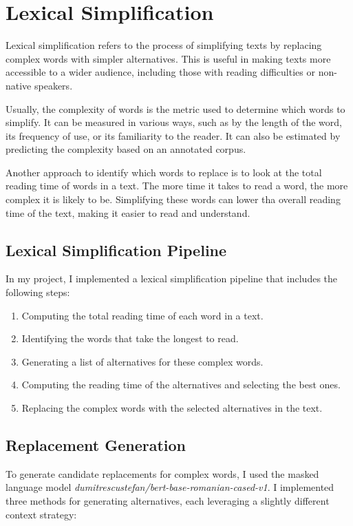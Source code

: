 \chapter{Lexical Simplification}

Lexical simplification refers to the process of simplifying texts by replacing complex words with simpler alternatives. This is useful in making texts more accessible to a wider audience, including those with reading difficulties or non-native speakers. 

Usually, the complexity of words is the metric used to determine which words to simplify. It can be measured in various ways, such as by the length of the word, its frequency of use, or its familiarity to the reader. It can also be estimated by predicting the complexity based on an annotated corpus. 

Another approach to identify which words to replace is to look at the total reading time of words in a text. The more time it takes to read a word, the more complex it is likely to be. Simplifying these words can lower tha overall reading time of the text, making it easier to read and understand.

\section{Lexical Simplification Pipeline}
In my project, I implemented a lexical simplification pipeline that includes the following steps:
\begin{enumerate}
    \item Computing the total reading time of each word in a text.
    \item Identifying the words that take the longest to read.
    \item Generating a list of alternatives for these complex words.
    \item Computing the reading time of the alternatives and selecting the best ones.
    \item Replacing the complex words with the selected alternatives in the text.
\end{enumerate}


\section{Replacement Generation}
To generate candidate replacements for complex words, I used the masked language model \textit{dumitrescustefan/bert-base-romanian-cased-v1}. I implemented three methods for generating alternatives, each leveraging a slightly different context strategy:

